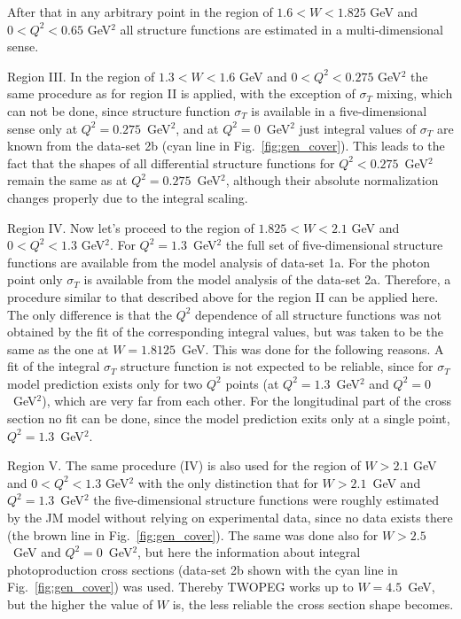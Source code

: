 After that in any arbitrary point in the region of $1.6 < W < 1.825$ GeV and $0<Q^2<0.65$ GeV$^2$ all structure functions are estimated in a multi-dimensional sense.


Region III. In the region of $1.3 < W < 1.6$ GeV and $0 < Q^2 < 0.275$ GeV$^2$ the same procedure as for region II is applied, with the exception of $\sigma_{T}$ mixing, which can not be done, since structure function $\sigma_{T}$ is available in a five-dimensional sense only at $Q^2 = 0.275$~GeV$^2$, and at $Q^2 = 0$~GeV$^2$ just integral values of $\sigma_{T}$ are known from the data-set 2b (cyan line in Fig.~\ref{fig:gen_cover}). This leads to the fact that the shapes of all differential structure functions for $Q^2 < 0.275$~GeV$^2$ remain the same as at  $Q^2 = 0.275$~GeV$^2$, although their absolute normalization changes properly due to the integral scaling.

Region IV. Now let's proceed to the region of $1.825 < W < 2.1$ GeV and $0<Q^2<1.3$ GeV$^2$. For $Q^2 = 1.3$~GeV$^2$ the full set of five-dimensional structure functions are available from the model analysis of data-set 1a. For the photon point only $\sigma_{T}$ is available from the model analysis of the data-set 2a. Therefore, a procedure similar to that described above for the region II can be applied here. The only difference is that the $Q^2$ dependence of all structure functions was not obtained by the fit of the corresponding integral values, but was taken to be the same as the one at $W = 1.8125$~GeV. This was done for the following reasons. A fit of the integral $\sigma_{T}$ structure function is not expected to be reliable, since for $\sigma_{T}$ model prediction exists only for two $Q^2$ points (at $Q^2 = 1.3$~GeV$^2$ and $Q^2 = 0$~GeV$^2$), which are very far from each other. For the longitudinal part of the cross section no fit can be done, since the model prediction exits only at a single point, $Q^2 = 1.3$~GeV$^2$. 

Region V. The same procedure (IV) is also used for the region of $W > 2.1$ GeV and $0<Q^2<1.3$ GeV$^2$ with the only distinction that for $W > 2.1$~GeV and $Q^2 = 1.3$~GeV$^2$ the five-dimensional structure functions were roughly estimated by the JM model without relying on experimental data, since no data exists there (the brown line in Fig.~\ref{fig:gen_cover}). The same was done also for $W > 2.5$~GeV and $Q^2 = 0$~GeV$^2$, but here the information about integral photoproduction cross sections (data-set 2b shown with the cyan line in Fig.~\ref{fig:gen_cover}) was used. Thereby TWOPEG works up to $W = 4.5$~GeV, but the higher the value of $W$ is, the less reliable the cross section shape becomes.

